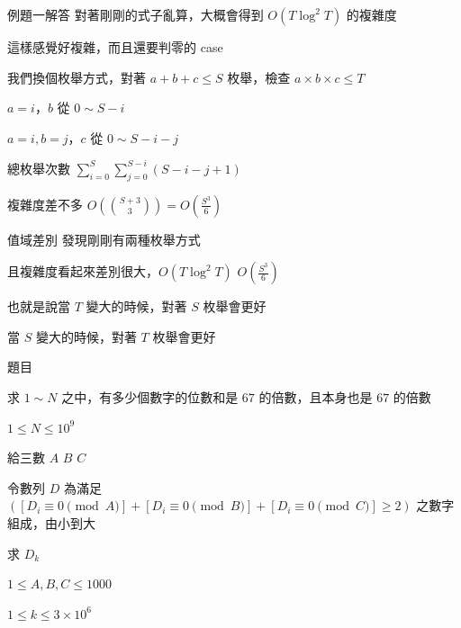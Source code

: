 \begin{frame}{例題一解答}
    對著剛剛的式子亂算，大概會得到 $O(T \log^2 T)$ 的複雜度

    這樣感覺好複雜，而且還要判零的 case\pause

    我們換個枚舉方式，對著 $a + b + c \le S$ 枚舉，檢查 $a \times b \times c \le T$

    $a = i$，$b$ 從 $0 \sim S-i$

    $a = i, b = j$，$c$ 從 $0 \sim S-i-j$

    總枚舉次數 $\sum^{S}_{i=0} \sum^{S-i}_{j=0} (S-i-j+1)$\pause

    複雜度差不多 $O(\binom{S+3}{3}) = O(\frac{S^3}{6})$
\end{frame}

\begin{frame}{值域差別}
    發現剛剛有兩種枚舉方式

    且複雜度看起來差別很大，$O(T \log^2 T)$ $O(\frac{S^3}{6})$\pause

    也就是說當 $T$ 變大的時候，對著 $S$ 枚舉會更好

    當 $S$ 變大的時候，對著 $T$ 枚舉會更好
\end{frame}

\begin{frame}{題目}
    \begin{exercise}
        求 $1 \sim N$ 之中，有多少個數字的位數和是 $67$ 的倍數，且本身也是 $67$ 的倍數

        $1 \le N \le 10^9$
    \end{exercise}

    \begin{exercise}
        給三數 $A$ $B$ $C$

        令數列 $D$ 為滿足 $([D_i \equiv 0 \pmod{A}] + [D_i \equiv 0 \pmod{B}] + [D_i \equiv 0 \pmod{C}] \ge 2)$ 之數字組成，由小到大

        求 $D_k$

        $1 \le A, B, C \le 1000$

        $1 \le k \le 3 \times 10^6$
    \end{exercise}
\end{frame}